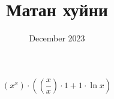\documentclass{article}
\begin{document}
\title{Матан хуйни}
\maketitle{}
\date{December 2023}
$$(x^{x})\cdot((\frac{x}{x})\cdot1+1\cdot\ln{x})$$
\end{document}
